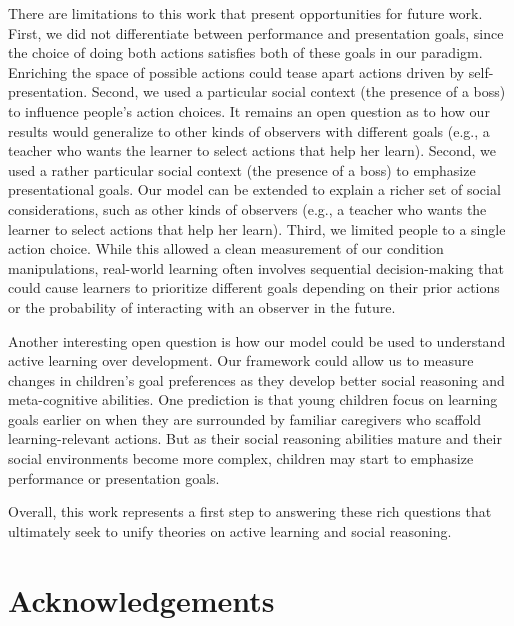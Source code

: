 \documentclass[10pt, letterpaper]{article}
\begin{document}
There are limitations to this work that present opportunities for future
work. First, we did not differentiate between performance and
presentation goals, since the choice of doing both actions satisfies
both of these goals in our paradigm. Enriching the space of possible
actions could tease apart actions driven by self-presentation. Second,
we used a particular social context (the presence of a boss) to
influence people's action choices. It remains an open question as to how
our results would generalize to other kinds of observers with different
goals (e.g., a teacher who wants the learner to select actions that help
her learn). Second, we used a rather particular social context (the
presence of a boss) to emphasize presentational goals. Our model can be
extended to explain a richer set of social considerations, such as other
kinds of observers (e.g., a teacher who wants the learner to select
actions that help her learn). Third, we limited people to a single
action choice. While this allowed a clean measurement of our condition
manipulations, real-world learning often involves sequential
decision-making that could cause learners to prioritize different goals
depending on their prior actions or the probability of interacting with
an observer in the future.

Another interesting open question is how our model could be used to
understand active learning over development. Our framework could allow
us to measure changes in children's goal preferences as they develop
better social reasoning and meta-cognitive abilities. One prediction is
that young children focus on learning goals earlier on when they are
surrounded by familiar caregivers who scaffold learning-relevant
actions. But as their social reasoning abilities mature and their social
environments become more complex, children may start to emphasize
performance or presentation goals.

Overall, this work represents a first step to answering these rich
questions that ultimately seek to unify theories on active learning and
social reasoning.

\vspace{1em}
\vspace{1em} \noindent

\section{Acknowledgements}\label{acknowledgements}
\end{document}
